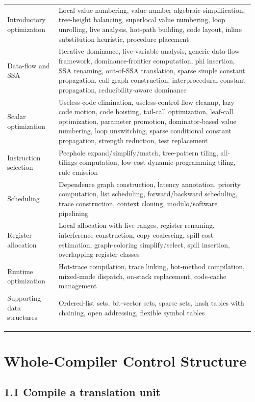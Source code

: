 \documentclass[10pt,letterpaper]{article}
\begin{document}
\begin{longtable}{L{0.27\textwidth}L{0.66\textwidth}}
Introductory optimization & Local value numbering, value-number algebraic simplification, tree-height balancing, superlocal value numbering, loop unrolling, live analysis, hot-path building, code layout, inline substitution heuristic, procedure placement \\
Data-flow and SSA & Iterative dominance, live-variable analysis, generic data-flow framework, dominance-frontier computation, phi insertion, SSA renaming, out-of-SSA translation, sparse simple constant propagation, call-graph construction, interprocedural constant propagation, reducibility-aware dominance \\
Scalar optimization & Useless-code elimination, useless-control-flow cleanup, lazy code motion, code hoisting, tail-call optimization, leaf-call optimization, parameter promotion, dominator-based value numbering, loop unswitching, sparse conditional constant propagation, strength reduction, test replacement \\
Instruction selection & Peephole expand/simplify/match, tree-pattern tiling, all-tilings computation, low-cost dynamic-programming tiling, rule emission \\
Scheduling & Dependence graph construction, latency annotation, priority computation, list scheduling, forward/backward scheduling, trace construction, context cloning, modulo/software pipelining \\
Register allocation & Local allocation with live ranges, register renaming, interference construction, copy coalescing, spill-cost estimation, graph-coloring simplify/select, spill insertion, overlapping register classes \\
Runtime optimization & Hot-trace compilation, trace linking, hot-method compilation, mixed-mode dispatch, on-stack replacement, code-cache management \\
Supporting data structures & Ordered-list sets, bit-vector sets, sparse sets, hash tables with chaining, open addressing, flexible symbol tables \\
\bottomrule
\end{longtable}

\medskip\hrule\medskip

\clearpage
\section{Whole-Compiler Control Structure}

\subsection*{1.1 Compile a translation unit}
{}
\end{document}

